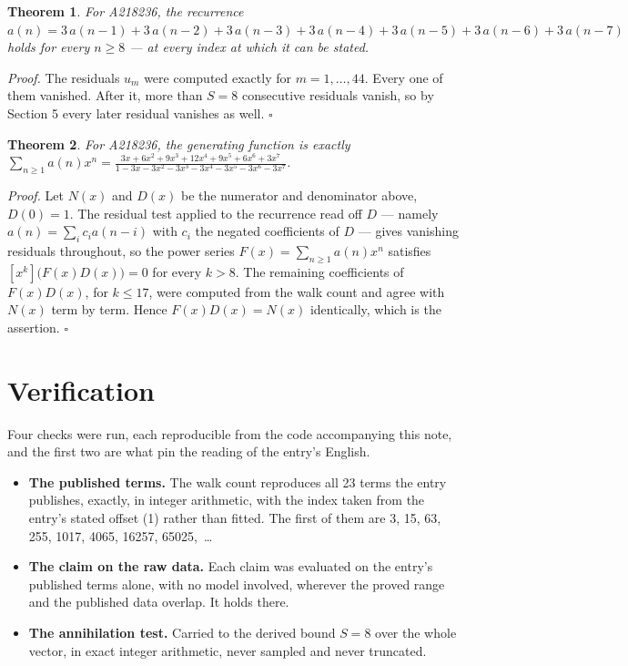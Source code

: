 \documentclass[11pt]{article}
\newtheorem{theorem}{Theorem}
\theoremstyle{definition}
\begin{document}
\begin{theorem} For A218236, the recurrence $a(n) = 3\,a(n-1) + 3\,a(n-2) + 3\,a(n-3) + 3\,a(n-4) + 3\,a(n-5) + 3\,a(n-6) + 3\,a(n-7)$ holds for every $n \ge 8$ --- at every index at which it can be stated.\end{theorem}

{\itshape Proof.} The residuals $u_m$ were computed exactly for $m = 1,\dots,44$. Every one of them vanished. After it, more than $S = 8$ consecutive residuals vanish, so by Section 5 every later residual vanishes as well. $\square$

\begin{theorem} For A218236, the generating function is exactly $\sum_{n\ge 1} a(n)x^n = \frac{3x + 6x^{2} + 9x^{3} + 12x^{4} + 9x^{5} + 6x^{6} + 3x^{7}}{1 - 3x - 3x^{2} - 3x^{3} - 3x^{4} - 3x^{5} - 3x^{6} - 3x^{7}}$.\end{theorem}

{\itshape Proof.} Let $N(x)$ and $D(x)$ be the numerator and denominator above, $D(0)=1$. The residual test applied to the recurrence read off $D$ --- namely $a(n) = \sum_i c_i a(n-i)$ with $c_i$ the negated coefficients of $D$ --- gives vanishing residuals throughout, so the power series $F(x)=\sum_{n\ge 1}a(n)x^n$ satisfies $[x^k]\bigl(F(x)D(x)\bigr) = 0$ for every $k > 8$. The remaining coefficients of $F(x)D(x)$, for $k \le 17$, were computed from the walk count and agree with $N(x)$ term by term. Hence $F(x)D(x) = N(x)$ identically, which is the assertion. $\square$

\section{Verification}

Four checks were run, each reproducible from the code accompanying this note, and the first two are what pin the reading of the entry's English.

\begin{itemize}

\item {\bfseries The published terms.} The walk count reproduces all 23 terms the entry publishes, exactly, in integer arithmetic, with the index taken from the entry's stated offset (1) rather than fitted. The first of them are 3, 15, 63, 255, 1017, 4065, 16257, 65025,~\dots

\item {\bfseries The claim on the raw data.} Each claim was evaluated on the entry's published terms alone, with no model involved, wherever the proved range and the published data overlap. It holds there.

\item {\bfseries The annihilation test.} Carried to the derived bound $S = 8$ over the whole vector, in exact integer arithmetic, never sampled and never truncated.

\end{itemize}
\end{document}
